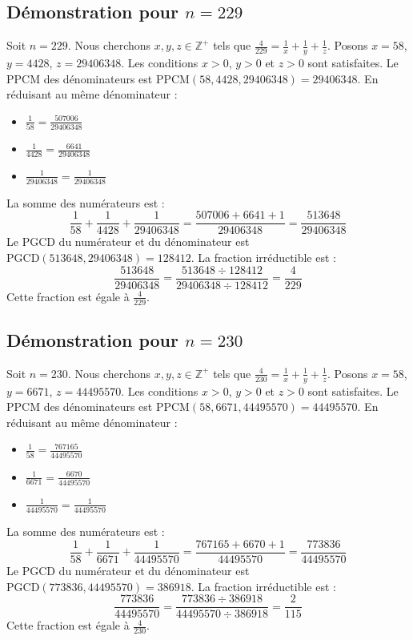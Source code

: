 \documentclass[11pt,a4paper]{article}
\begin{document}
\subsection{Démonstration pour $n = 229$}
Soit $n = 229$. Nous cherchons $x, y, z \in \mathbb{Z}^{+}$ tels que $\frac{4}{229} = \frac{1}{x} + \frac{1}{y} + \frac{1}{z}$.
Posons $x = 58$, $y = 4428$, $z = 29406348$.
Les conditions $x > 0$, $y > 0$ et $z > 0$ sont satisfaites.
Le PPCM des dénominateurs est $\text{PPCM}(58, 4428, 29406348) = 29406348$.
En réduisant au même dénominateur :
\begin{itemize}
    \item $\frac{1}{58} = \frac{507006}{29406348}$
    \item $\frac{1}{4428} = \frac{6641}{29406348}$
    \item $\frac{1}{29406348} = \frac{1}{29406348}$
\end{itemize}
La somme des numérateurs est :
$$ \frac{1}{58} + \frac{1}{4428} + \frac{1}{29406348} = \frac{507006 + 6641 + 1}{29406348} = \frac{513648}{29406348} $$
Le PGCD du numérateur et du dénominateur est $\text{PGCD}(513648, 29406348) = 128412$.
La fraction irréductible est :
$$ \frac{513648}{29406348} = \frac{513648 \div 128412}{29406348 \div 128412} = \frac{4}{229} $$
Cette fraction est égale à $\frac{4}{229}$.

\subsection{Démonstration pour $n = 230$}
Soit $n = 230$. Nous cherchons $x, y, z \in \mathbb{Z}^{+}$ tels que $\frac{4}{230} = \frac{1}{x} + \frac{1}{y} + \frac{1}{z}$.
Posons $x = 58$, $y = 6671$, $z = 44495570$.
Les conditions $x > 0$, $y > 0$ et $z > 0$ sont satisfaites.
Le PPCM des dénominateurs est $\text{PPCM}(58, 6671, 44495570) = 44495570$.
En réduisant au même dénominateur :
\begin{itemize}
    \item $\frac{1}{58} = \frac{767165}{44495570}$
    \item $\frac{1}{6671} = \frac{6670}{44495570}$
    \item $\frac{1}{44495570} = \frac{1}{44495570}$
\end{itemize}
La somme des numérateurs est :
$$ \frac{1}{58} + \frac{1}{6671} + \frac{1}{44495570} = \frac{767165 + 6670 + 1}{44495570} = \frac{773836}{44495570} $$
Le PGCD du numérateur et du dénominateur est $\text{PGCD}(773836, 44495570) = 386918$.
La fraction irréductible est :
$$ \frac{773836}{44495570} = \frac{773836 \div 386918}{44495570 \div 386918} = \frac{2}{115} $$
Cette fraction est égale à $\frac{4}{230}$.
\end{document}
